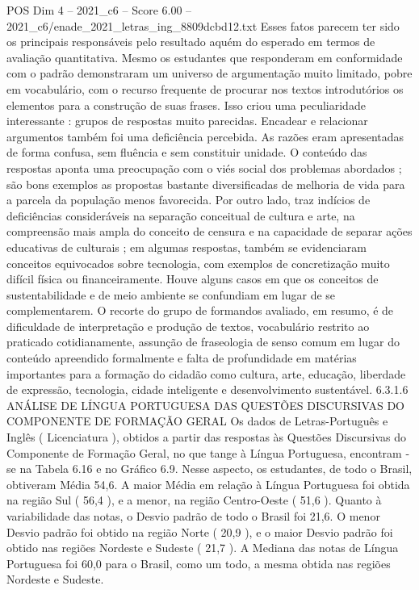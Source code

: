 \begin{textsample}{POS Dim 4 – 2021\_c6 – Score 6.00 – 2021\_c6/enade\_2021\_letras\_ing\_8809dcbd12.txt}
Esses fatos parecem ter sido os principais responsáveis pelo resultado aquém do esperado em termos de avaliação quantitativa.
Mesmo os estudantes que responderam em conformidade com o padrão demonstraram um universo de argumentação muito limitado, pobre em vocabulário, com o recurso frequente de procurar nos textos introdutórios os elementos para a construção de suas frases.
Isso criou uma peculiaridade interessante : grupos de respostas muito parecidas.
Encadear e relacionar argumentos também foi uma deficiência percebida.
As razões eram apresentadas de forma confusa, sem fluência e sem constituir unidade.
O conteúdo das respostas aponta uma preocupação com o viés social dos problemas abordados ; são bons exemplos as propostas bastante diversificadas de melhoria de vida para a parcela da população menos favorecida.
Por outro lado, traz indícios de deficiências consideráveis na separação conceitual de cultura e arte, na compreensão mais ampla do conceito de censura e na capacidade de separar ações educativas de culturais ; em algumas respostas, também se evidenciaram conceitos equivocados sobre tecnologia, com exemplos de concretização muito difícil física ou financeiramente.
Houve alguns casos em que os conceitos de sustentabilidade e de meio ambiente se confundiam em lugar de se complementarem.
O recorte do grupo de formandos avaliado, em resumo, é de dificuldade de interpretação e produção de textos, vocabulário restrito ao praticado cotidianamente, assunção de fraseologia de senso comum em lugar do conteúdo apreendido formalmente e falta de profundidade em matérias importantes para a formação do cidadão como cultura, arte, educação, liberdade de expressão, tecnologia, cidade inteligente e desenvolvimento sustentável. 6.3.1.6 ANÁLISE DE LÍNGUA PORTUGUESA DAS QUESTÕES DISCURSIVAS DO COMPONENTE DE FORMAÇÃO GERAL Os dados de Letras-Português e Inglês ( Licenciatura ), obtidos a partir das respostas às Questões Discursivas do Componente de Formação Geral, no que tange à Língua Portuguesa, encontram -se na Tabela 6.16 e no Gráfico 6.9.
Nesse aspecto, os estudantes, de todo o Brasil, obtiveram Média 54,6.
A maior Média em relação à Língua Portuguesa foi obtida na região Sul ( 56,4 ), e a menor, na região Centro-Oeste ( 51,6 ).
Quanto à variabilidade das notas, o Desvio padrão de todo o Brasil foi 21,6.
O menor Desvio padrão foi obtido na região Norte ( 20,9 ), e o maior Desvio padrão foi obtido nas regiões Nordeste e Sudeste ( 21,7 ).
A Mediana das notas de Língua Portuguesa foi 60,0 para o Brasil, como um todo, a mesma obtida nas regiões Nordeste e Sudeste.

\end{textsample}
